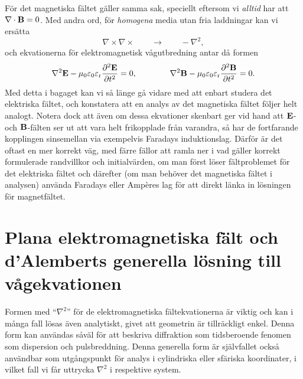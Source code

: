 F{\"o}r det magnetiska f{\"a}ltet g{\"a}ller samma sak, speciellt eftersom vi
{\it alltid} har att $\nabla\cdot{\bf B}=0$. Med andra ord, f{\"o}r
{\it homogena} media utan fria laddningar kan vi ers{\"a}tta
$$
  \nabla\times\nabla\times\qquad\to\qquad-\nabla^2,
$$
och ekvationerna f{\"o}r elektromagnetisk v{\aa}gutbredning antar d{\aa} formen
$$
  \nabla^2{\bf E} - \mu_0\varepsilon_0\varepsilon_{\rm r}
    {{\partial^2{\bf E}}\over{\partial t^2}} = 0,
  \qquad\qquad
  \nabla^2{\bf B} - \mu_0\varepsilon_0\varepsilon_{\rm r}
    {{\partial^2{\bf B}}\over{\partial t^2}} = 0.
$$
Med detta i bagaget kan vi s{\aa} l{\"a}nge g{\aa} vidare med att enbart
studera det elektriska f{\"a}ltet, och konstatera att en analys av det
magnetiska f{\"a}ltet f{\"o}ljer helt analogt. Notera dock att {\"a}ven om
dessa ekvationer skenbart ger vid hand att ${\bf E}$- och ${\bf B}$-f{\"a}lten
ser ut att vara helt frikopplade fr{\aa}n varandra, s{\aa} har de fortfarande
kopplingen sinsemellan via exempelvis Faradays induktionslag. D{\"a}rf{\"o}r
{\"a}r det oftast en mer korrekt v{\"a}g, med f{\"a}rre f{\"a}llor att ramla
ner i vad g{\"a}ller korrekt formulerade randvillkor och initialv{\"a}rden,
om man f{\"o}rst l{\"o}ser f{\"a}ltproblemet f{\"o}r det elektriska f{\"a}ltet
och d{\"a}refter (om man beh{\"o}ver det magnetiska f{\"a}ltet i analysen)
anv{\"a}nda Faradays eller Amp\`eres lag f{\"o}r att direkt l{\"a}nka in
l{\"o}sningen f{\"o}r magnetf{\"a}ltet.

\section{Plana elektromagnetiska f{\"a}lt och d'Alemberts generella l{\"o}sning
         till v{\aa}gekvationen}
Formen med ``$\nabla^2$'' f{\"o}r de elektromagnetiska f{\"a}ltekvationerna
{\"a}r viktig och kan i m{\aa}nga fall l{\"o}sas {\"a}ven analytiskt, givet
att geometrin {\"a}r tillr{\"a}ckligt enkel. Denna form kan anv{\"a}ndas
s{\aa}v{\"a}l f{\"o}r att beskriva diffraktion som tidsberoende fenomen som
dispersion och pulsbreddning. Denna generella form {\"a}r sj{\"a}lvfallet
ocks{\aa} anv{\"a}ndbar som utg{\aa}ngspunkt f{\"o}r analys i cylindriska
eller sf{\"a}riska koordinater, i vilket fall vi f{\aa}r uttrycka $\nabla^2$
i respektive system.

